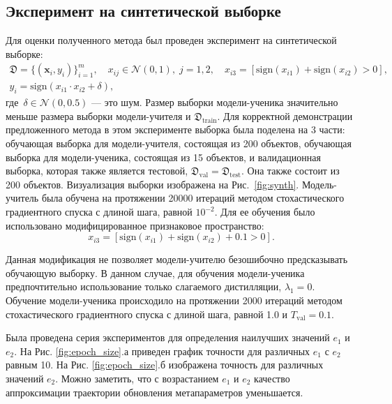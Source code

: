 \documentclass[12pt]{a&t}
\begin{document}
 
\subsection{Эксперимент на синтетической выборке}
Для оценки полученного метода был проведен эксперимент на синтетической выборке:
\begin{gather*}
    \mathfrak{D} = \{(\mathbf{x}_i, y_i)\}_{i=1}^{m}, \quad x_{ij} \in \mathcal{N}(0, 1),\; j=1, 2, \quad x_{i3} = [\text{sign}(x_{i1})+\text{sign}(x_{i2})>0],\\
    y_i = \text{sign}(x_{i1}\cdot x_{i2}+\delta),
\end{gather*}
где~$\delta \in \mathcal{N}(0, 0.5)$ --- это шум. Размер выборки модели-ученика значительно меньше размера выборки модели-учителя и  $\mathfrak{D}_\text{train}$. Для корректной демонстрации предложенного метода в этом эксперименте выборка была поделена на 3 части: обучающая выборка для модели-учителя, состоящая из 200 объектов, обучающая выборка для модели-ученика, состоящая из 15 объектов, и валидационная выборка, которая также является тестовой, $\mathfrak{D}_\text{val} = \mathfrak{D}_\text{test}$. Она также состоит из 200 объектов. Визуализация выборки изображена на Рис.~\ref{fig:synth}. Модель-учитель была обучена на протяжении 20000 итераций методом стохастического градиентного спуска с длиной шага, равной $10^{-2}.$ Для ее обучения было использовано модифицированное признаковое пространство:
\[
    x_{i3} = [\text{sign}(x_{i1})+\text{sign}(x_{i2}) + 0.1 >0].
\]

Данная модификация не позволяет модели-учителю безошибочно предсказывать обучающую выборку. В данном случае, для обучения модели-ученика предпочтительно использование только слагаемого дистилляции, $\lambda_1 = 0$. Обучение модели-ученика происходило на протяжении 2000 итераций методом стохастического градиентного спуска с длиной шага, равной 1.0 и $T_\text{val} = 0.1.$

Была проведена серия экспериментов для определения наилучших значений $e_1$ и $e_2$. На Рис. \ref{fig:epoch_size}.а приведен график точности для различных $e_1$ с $e_2$ равным 10. На Рис. \ref{fig:epoch_size}.б изображена точность для различных значений $e_2$. Можно заметить, что с возрастанием $e_1$ и $e_2$ качество аппроксимации траектории обновления метапараметров уменьшается.
\end{document}
